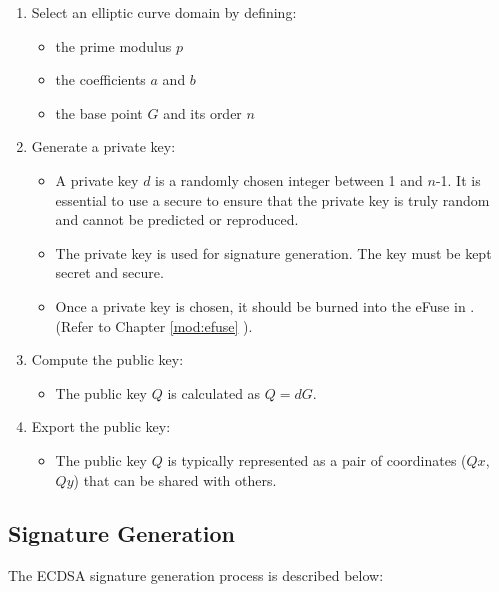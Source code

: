 \documentclass[main\_\_EN.tex]{subfiles}
\begin{document}
\begin{enumerate}
    \item Select an elliptic curve domain by defining:
    \begin{itemize}
        \item the prime modulus $p$
        \item the coefficients $a$ and $b$
        \item the base point $G$ and its order $n$
    \end{itemize}
    \item Generate a private key:
    \begin{itemize}
        \item A private key $d$ is a randomly chosen integer between 1 and $n$-1. It is essential to use a secure  to ensure that the private key is truly random and cannot be predicted or reproduced.
        \item The private key is used for signature generation. The key must be kept secret and secure.
        \item Once a private key is chosen, it should be burned into the eFuse in \chipname{}. (Refer to Chapter \ref{mod:efuse} \textit{}).
    \end{itemize}
    \item Compute the public key:
    \begin{itemize}
        \item The public key $Q$ is calculated as $Q = dG$.
    \end{itemize}
    \item Export the public key:
    \begin{itemize}
        \item The public key $Q$ is typically represented as a pair of coordinates ($Qx$, $Qy$) that can be shared with others.
    \end{itemize}
\end{enumerate}

\subsection{Signature Generation}

The ECDSA signature generation process is described below:
\end{document}
